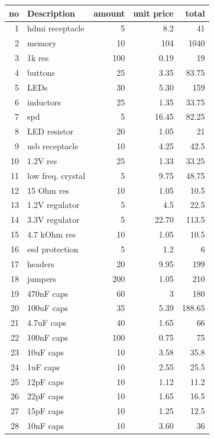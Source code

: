 \documentclass[../main/report.tex]{subfiles}
\begin{document}
\begin{table}[h]
\begin{tabular}{| r | l | r | r | r |}\hline
		no & Description  & amount & unit price & total \\\hline
		1 & hdmi receptacle  & 5  & 8.2 & 41 \\\hline
		2 & memory  & 10  & 104 & 1040 \\\hline
		3 & 1k res  & 100  & 0.19 & 19 \\\hline
		4 & buttons & 25 & 3.35 & 83.75 \\\hline
		5 & LEDs & 30 & 5.30 & 159 \\\hline
		6 & inductors & 25 & 1.35 & 33.75 \\\hline
		7 & spd & 5 & 16.45 & 82.25 \\\hline
		8 & LED resistor & 20 & 1.05 & 21 \\\hline
		9 & usb receptacle & 10 & 4.25 & 42.5 \\\hline
		10 & 1.2V res & 25 & 1.33 & 33.25 \\\hline
		11 & low freq. crystal & 5 & 9.75 & 48.75 \\\hline
		12 & 15 Ohm res & 10 & 1.05 & 10.5 \\\hline
		13 & 1.2V regulator & 5 & 4.5 & 22.5 \\\hline
		14 & 3.3V regulator & 5 & 22.70 & 113.5 \\\hline
		15 & 4.7 kOhm res & 10 & 1.05 & 10.5 \\\hline
		16 & esd protection & 5 & 1.2 & 6 \\\hline
		17 & headers & 20 & 9.95 & 199 \\\hline
		18 & jumpers & 200 & 1.05 & 210 \\\hline
		19 & 470nF caps & 60 & 3 & 180 \\\hline
		20 & 100uF caps & 35& 5.39 & 188.65 \\\hline
		21 & 4.7uF caps & 40 & 1.65 & 66 \\\hline
		22 & 100nF caps & 100 & 0.75 & 75 \\\hline
		23 & 10uF caps & 10 & 3.58 & 35.8 \\\hline
		24 & 1uF caps & 10 & 2.55 & 25.5  \\\hline
		25 & 12pF caps & 10 & 1.12 & 11.2 \\\hline 
		26 & 22pF caps & 10 & 1.65 & 16.5 \\\hline
		27 & 15pF caps & 10 & 1.25 & 12.5 \\\hline
		28 & 10nF caps & 10 & 3.60 & 36 \\\hline

\end{tabular}
\end{table}
\end{document}
